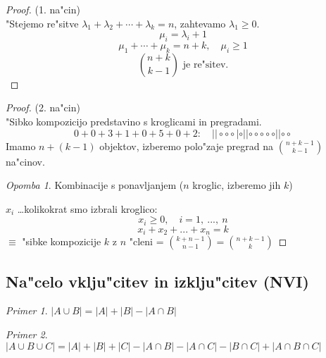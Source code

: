 \documentclass[a4paper,12pt]{article}
\theoremstyle{definition}
\theoremstyle{remark}
\newtheorem*{ex}{Primer}
\newtheorem*{rem}{Opomba}
\begin{document}
\begin{proof}(1. na"cin)\\
	"Stejemo re"sitve $\lambda_1 + \lambda_2 + \cdots + \lambda_k = n$, zahtevamo $\lambda_1 \geqslant 0$.
	\[\mu_i = \lambda_i + 1\]
	\[\mu_1 + \cdots + \mu_k = n + k,\quad \mu_i \geqslant 1\]
	\[\binom{n+k}{k-1} \text{ je re"sitev.}\]
\end{proof}
\begin{proof}(2. na"cin)\\
	"Sibko kompozicijo predstavino s kroglicami in pregradami.
	\[0 + 0 + 3 + 1 + 0 + 5 + 0 + 2:\quad ||\circ \circ \circ|\circ||\circ \circ \circ \circ \circ||\circ \circ\]
	Imamo $n + (k - 1)$ objektov, izberemo polo"zaje pregrad na $\binom{n + k - 1}{k - 1}$ na"cinov.\\
	\begin{rem}
		Kombinacije s ponavljanjem ($n$ kroglic, izberemo jih $k$)
	\end{rem}
	$x_i$ \ldots kolikokrat smo izbrali kroglico:
	\[x_i \geqslant 0, \quad i = 1, \ ..., \ n\]
	\[x_i + x_2 + ... + x_n = k\]
	$\equiv$ "sibke kompozicije $k$ z $n$ "cleni = $\binom{k + n - 1}{n - 1} = \binom{n + k - 1}{k}$
\end{proof}

\subsection{Na"celo vklju"citev in izklju"citev (NVI)}
\begin{ex}
	$|A \cup B| = |A| + |B| - |A \cap B|$
	\label{TODO: add image 2}
\end{ex}
\begin{ex}
	$|A \cup B \cup C| = |A| + |B| + |C| - |A \cap B| - |A \cap C| - |B \cap C| + |A \cap B \cap C|$
	\label{TODO: add image 3}
\end{ex}
\end{document}
